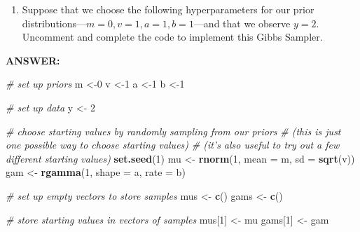 \documentclass[
]{article}
\newenvironment{Shaded}{\begin{snugshade}}{\end{snugshade}}
\newcommand{\CommentTok}[1]{\textcolor[rgb]{0.56,0.35,0.01}{\textit{#1}}}
\newcommand{\DataTypeTok}[1]{\textcolor[rgb]{0.13,0.29,0.53}{#1}}
\newcommand{\DecValTok}[1]{\textcolor[rgb]{0.00,0.00,0.81}{#1}}
\newcommand{\KeywordTok}[1]{\textcolor[rgb]{0.13,0.29,0.53}{\textbf{#1}}}
\newcommand{\NormalTok}[1]{#1}
\newcommand{\StringTok}[1]{\textcolor[rgb]{0.31,0.60,0.02}{#1}}
\providecommand{\tightlist}{%
  \setlength{\itemsep}{0pt}\setlength{\parskip}{0pt}}
\begin{document}
\begin{enumerate}
\def\labelenumi{\arabic{enumi}.}
\setcounter{enumi}{3}
\tightlist
\item
  Suppose that we choose the following hyperparameters for our prior
  distributions---\(m = 0, v = 1, a = 1, b = 1\)---and that we observe
  \(y = 2\). Uncomment and complete the code to implement this Gibbs
  Sampler.
\end{enumerate}

\textbf{ANSWER:}

\begin{Shaded}
\begin{Highlighting}[]
\CommentTok{# set up priors}
\NormalTok{m <-}\DecValTok{0}
\NormalTok{v <-}\DecValTok{1}
\NormalTok{a <-}\DecValTok{1}
\NormalTok{b <-}\DecValTok{1}

\CommentTok{# set up data}
\NormalTok{ y <-}\StringTok{ }\DecValTok{2}

\CommentTok{# choose starting values by randomly sampling from our priors}
\CommentTok{# (this is just one possible way to choose starting values)}
\CommentTok{# (it's also useful to try out a few different starting values)}
\KeywordTok{set.seed}\NormalTok{(}\DecValTok{1}\NormalTok{)}
\NormalTok{mu <-}\StringTok{ }\KeywordTok{rnorm}\NormalTok{(}\DecValTok{1}\NormalTok{, }\DataTypeTok{mean =}\NormalTok{ m, }\DataTypeTok{sd =} \KeywordTok{sqrt}\NormalTok{(v))}
\NormalTok{gam <-}\StringTok{ }\KeywordTok{rgamma}\NormalTok{(}\DecValTok{1}\NormalTok{, }\DataTypeTok{shape =}\NormalTok{ a, }\DataTypeTok{rate =}\NormalTok{ b)}

\CommentTok{# set up empty vectors to store samples}
\NormalTok{mus <-}\StringTok{ }\KeywordTok{c}\NormalTok{()}
\NormalTok{gams <-}\StringTok{ }\KeywordTok{c}\NormalTok{()}

\CommentTok{# store starting values in vectors of samples}
\NormalTok{mus[}\DecValTok{1}\NormalTok{] <-}\StringTok{ }\NormalTok{mu}
\NormalTok{gams[}\DecValTok{1}\NormalTok{] <-}\StringTok{ }\NormalTok{gam}
\end{Highlighting}
\end{Shaded}
\end{document}

